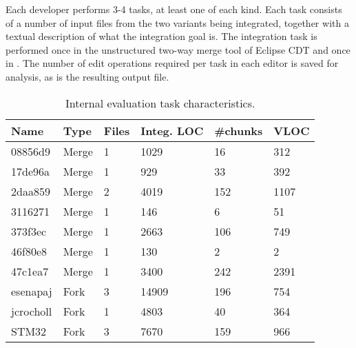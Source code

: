 Each developer performs 3-4 tasks, at least one of each kind. Each task consists of a number of input files from the two variants being integrated, together with a textual description of what the integration goal is. The integration task is performed once in the unstructured two-way merge tool of Eclipse CDT and once in \tooln. The number of edit operations required per task in each editor is saved for analysis, as is the resulting output file. 

\begin{table}[ht]
    \centering
    \caption{Internal evaluation task characteristics.}
    \label{tab:internalchar}
    \begin{tabular}{lll|lll}
\hline\hline
\textbf{Name} & \textbf{Type} & \textbf{Files} & \textbf{Integ. LOC} & \textbf{\#chunks} & \textbf{VLOC} \\
\hline
08856d9      & Merge     & 1 & 1029 & 16  & 312   \\
17de96a      & Merge     & 1 & 929  & 33  & 392  \\
2daa859      & Merge     & 2 & 4019 & 152 & 1107   \\
3116271      & Merge     & 1 & 146  & 6   & 51    \\
373f3ec      & Merge     & 1 & 2663 & 106 & 749   \\
46f80e8      & Merge     & 1 & 130  & 2   & 2    \\
47c1ea7      & Merge     & 1 & 3400 & 242 & 2391 \\
\hline
esenapaj     & Fork         & 3 & 14909 & 196   & 754   \\
jcrocholl    & Fork         & 1 & 4803  & 40    & 364   \\
STM32        & Fork         & 3 & 7670  & 159   & 966   \\
\hline\hline
    \end{tabular}
\end{table}

